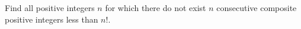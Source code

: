Find all positive integers $n$ for which there do not exist $n$ consecutive composite positive integers less than $n!$.